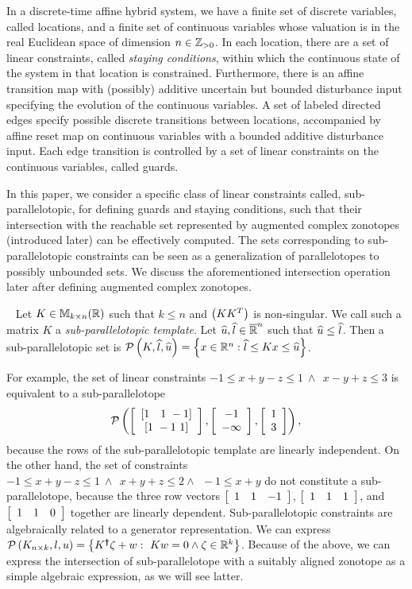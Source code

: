 
In a discrete-time affine hybrid system, we have a finite set of
discrete variables, called locations, and a finite set of continuous
variables whose valuation is in the real Euclidean space of dimension
$n\in\mathbb{Z}_{> 0}$.  In each location, there are a set of linear constraints,
called \emph{staying conditions}, within which the continuous state of
the system in that location is constrained.  Furthermore, there is an
affine transition map with (possibly) additive uncertain but bounded
disturbance input specifying the evolution of the continuous
variables. A set of labeled directed edges specify possible discrete
transitions between locations, accompanied by affine reset map on
continuous variables with a bounded additive disturbance input. Each
edge transition is controlled by a set of linear constraints on the
continuous variables, called guards.

In this paper, we consider a specific class of linear constraints
called, sub-parallelotopic, for defining guards and staying
conditions, such that their intersection with the reachable set
represented by augmented complex zonotopes (introduced later) can be
effectively computed. The sets corresponding to sub-parallelotopic
constraints can be seen as a generalization of parallelotopes to
possibly unbounded sets.  We discuss the aforementioned intersection
operation later after defining augmented complex zonotopes.
%
\begin{definition}~\label{defn:sub-parallelotope} Let
  $K\in\mathbb{M}_{k\times n}(\mathbb{R})$ such that $k\leq n$ and $\left(KK^T\right)$ is
  non-singular.  We call such a matrix $K$ a
  \emph{sub-parallelotopic template}.  Let
  $\widehat{u},\widehat{l}\in\mathbb{\overline{R}}^n$ such that $\widehat{u}\leq\widehat{l}$.  Then
  a sub-parallelotopic set is $\mathcal{P}\left(K,\widehat{l},\widehat{u}\right) = \left\{x\in\mathbb{R}^n: \widehat{l}\leq Kx \leq \widehat{u}\right\}$.
\end{definition}
%
For example, the set of linear constraints $-1\leq x+y-z\leq
1~\wedge~~ x-y+z\leq 3$ is equivalent to a sub-parallelotope
$$\mathcal{P}\left(\left[\begin{array}{c}{\left[1~~~1~-1\right]}\\{\left[1~-1~1\right]} \end{array}\right],\left[\begin{array}{c}{-1}\\{-\infty} \end{array}\right],\left[\begin{array}{c}{1}\\{3} \end{array}\right]\right),$$
because the rows of the sub-parallelotopic template are linearly
independent.  On the other hand, the set of constraints $-1\leq
x+y-z\leq 1~\wedge~~x+y+z\leq 2\wedge~~-1\leq x+y$ do not constitute a
sub-parallelotope, because the three row vectors $\left[\begin{array}{c
c c}1 & 1 & -1\end{array}\right]$, $\left[\begin{array}{c c c}1 & 1 &
1\end{array}\right]$, and $\left[\begin{array}{c c c}1 & 1 &
0\end{array}\right]$ together are linearly dependent.  Sub-parallelotopic
constraints are algebraically related to a generator representation.
We can express $\mathcal{P}\left(K_{n\times
k},l,u\right)=\left\{K^{\bm{\dagger}}\zeta+w:~Kw=0\wedge\zeta\in\mathbb{R}^k\right\}$.
Because of the above, we can express the intersection of
sub-parallelotope with a suitably aligned zonotope as a simple
algebraic expression, as we will see latter.


